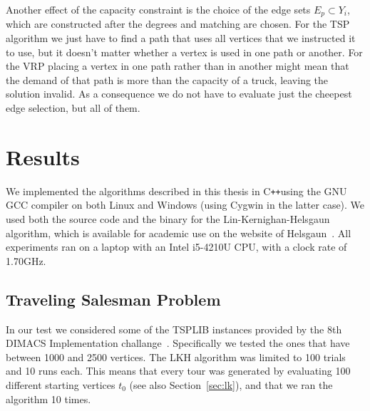 \documentclass[12pt]{article}
\newcommand{\cpp}[0]{C\texttt{++}}
\begin{document}
    Another effect of the capacity constraint is the choice of the edge sets $E_p \subset Y_i$,
    which are constructed after the degrees and matching are chosen. For the TSP algorithm we just
    have to find a path that uses all vertices that we instructed it to use, but it doesn't matter
    whether a vertex is used in one path or another. For the VRP placing a vertex in one path rather
    than in another might mean that the demand of that path is more than the capacity of a truck,
    leaving the solution invalid. As a consequence we do not have to evaluate just the cheepest edge
    selection, but all of them.




%
%
\section{Results}
\label{sec:results}
We implemented the algorithms described in this thesis in \cpp\;using the GNU GCC compiler on both
Linux and Windows (using Cygwin in the latter case). We used both the source code and the binary for
the Lin-Kernighan-Helsgaun algorithm, which is available for academic use on the website of
Helsgaun~\cite{lkh-url}.
All experiments ran on a laptop with an Intel i5-4210U CPU, with a clock rate of 1.70GHz.

    \subsection{Traveling Salesman Problem}
    In our test we considered some of the TSPLIB instances provided by the 8th DIMACS Implementation
    challange~\cite{tsp-instances}. Specifically we tested the ones that have between 1000 and 2500
    vertices.  The LKH algorithm was limited to 100 trials and 10 runs each. This means that every
    tour was generated by evaluating 100 different starting vertices $t_0$ (see also
    Section~\ref{sec:lk}), and that we ran the algorithm 10 times.
\end{document}

